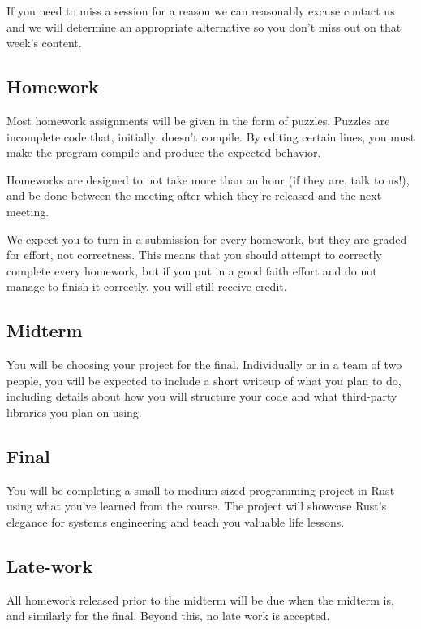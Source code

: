 \documentclass{article}
\begin{document}
If you need to miss a session for a reason we can reasonably excuse contact us
and we will determine an appropriate alternative so you don't miss out on that
week's content.

\subsection*{Homework}
 
Most homework assignments will be given in the form of puzzles. Puzzles are
incomplete code that, initially, doesn't compile. By editing certain lines, you
must make the program compile and produce the expected behavior.

Homeworks are designed to not take more than an hour (if they are, talk to us!),
and be done between the meeting after which they're released and the next
meeting.

We expect you to turn in a submission for every homework, but they are graded
for effort, not correctness. This means that you should attempt to correctly
complete every homework, but if you put in a good faith effort and do not manage
to finish it correctly, you will still receive credit.

\subsection*{Midterm}

You will be choosing your project for the final. Individually or in a team of
two people, you will be expected to include a short writeup of what you plan to
do, including details about how you will structure your code and what
third-party libraries you plan on using.

\subsection*{Final}

You will be completing a small to medium-sized programming project in Rust using
what you've learned from the course. The project will showcase Rust's elegance
for systems engineering and teach you valuable life lessons.

\subsection*{Late-work}

All homework released prior to the midterm will be due when the midterm is, and
similarly for the final. Beyond this, no late work is accepted.
\end{document}
